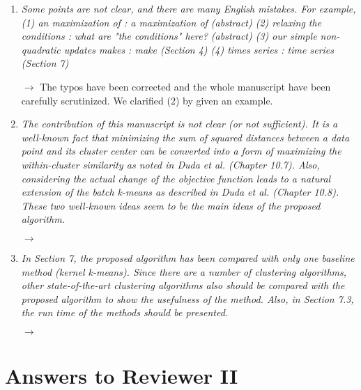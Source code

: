 \documentclass[10pt]{article}
\begin{document}
\begin{enumerate}

\item \emph{Some points are not clear, and there are many English mistakes. For example,
(1) an maximization of : a maximization of (abstract)
(2) relaxing the conditions : what are "the conditions" here? (abstract)
(3) our simple non-quadratic updates makes : make (Section 4)
(4) times series : time series (Section 7)}

$\rightarrow$ The typos have been corrected and the whole manuscript have been carefully scrutinized. We clarified (2) by given an example.

\item \emph{The contribution of this manuscript is not clear (or not sufficient). It is a well-known fact that minimizing the sum of squared distances between a data point and its cluster center can be converted into a form of maximizing the within-cluster similarity as noted in Duda et al. (Chapter 10.7). Also, considering the actual change of the objective function leads to a natural extension of the batch k-means as described in Duda et al. (Chapter 10.8). These two well-known ideas seem to be the main ideas of the proposed algorithm.}

$\rightarrow$

\item \emph{In Section 7, the proposed algorithm has been compared with only one baseline method (kernel k-means). Since there are a number of clustering algorithms, other state-of-the-art clustering algorithms also should be compared with the proposed algorithm to show the usefulness of the method. Also, in Section 7.3, the run time of the methods should be presented.}

$\rightarrow$

\end{enumerate}

\section{Answers to Reviewer II}
\end{document}
